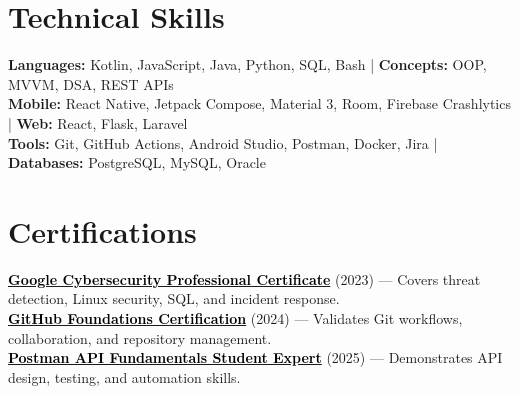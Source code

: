 \documentclass[a4paper]{article}
\begin{document}
\section{Technical Skills}
\begin{itemize}[leftmargin=0.15in, label={}]
\small{\item{
\textbf{Languages:} Kotlin, JavaScript, Java, Python, SQL, Bash \;|\;
\textbf{Concepts:} OOP, MVVM, DSA, REST APIs\\
\textbf{Mobile:} React Native, Jetpack Compose, Material 3, Room, Firebase Crashlytics \;|\;
\textbf{Web:} React, Flask, Laravel\\
\textbf{Tools:} Git, GitHub Actions, Android Studio, Postman, Docker, Jira \;|\;
\textbf{Databases:} PostgreSQL, MySQL, Oracle
}}
\end{itemize}




\section{Certifications}
 \begin{itemize}[leftmargin=0.15in, label={}]
    \small{\item{
    \href{https://coursera.org/share/44fd8f381cb39ac45892569cdf6f7674}{\textcolor{black}{\textbf{Google Cybersecurity Professional Certificate}}} (2023) --- Covers threat detection, Linux security, SQL, and incident response. \\
    \href{https://www.credly.com/badges/d5c30c19-02db-4c5f-9bc9-4bd0f4b6a89e/public_url}{\textcolor{black}{\textbf{GitHub Foundations Certification}}} (2024) --- Validates Git workflows, collaboration, and repository management. \\
    \href{https://badges.parchment.com/public/assertions/ZF0yx-i3T1CvXYwDLEUneA?identity__email=sakib.sadman.badhon\%40g.bracu.ac.bd}{\textcolor{black}{\textbf{Postman API Fundamentals Student Expert}}} (2025) --- Demonstrates API design, testing, and automation skills.
    }}
 \end{itemize}


\end{document}
